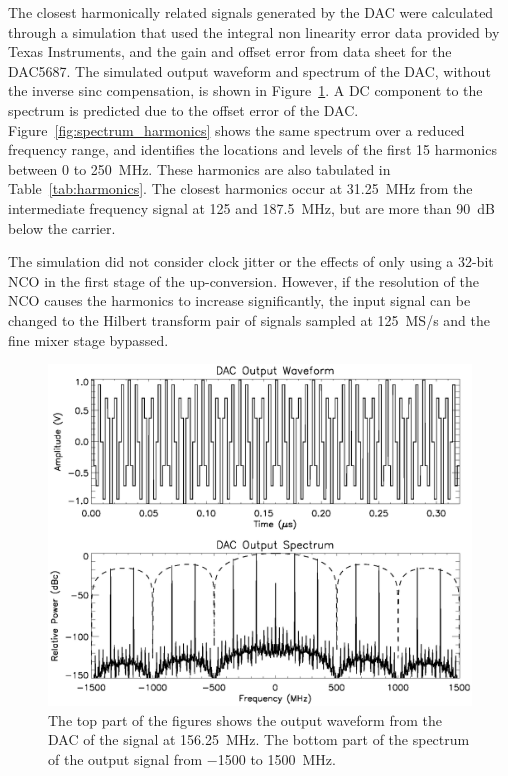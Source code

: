 \documentclass[12pt,letterpaper]{article}
\begin{document}
The closest harmonically related signals generated by the DAC were
calculated through a simulation that used the integral non linearity
error data provided by Texas Instruments, and the gain and offset
error from data sheet for the DAC5687. The simulated output waveform
and spectrum of the DAC, without the inverse sinc compensation, is
shown in Figure~\ref{fig:spectrum_images}. A DC component to the
spectrum is predicted due to the offset error of the
DAC. Figure~\ref{fig:spectrum_harmonics} shows the same spectrum over
a reduced frequency range, and identifies the locations and levels of
the first 15 harmonics between 0 to 250~MHz. These harmonics are also
tabulated in Table~\ref{tab:harmonics}. The closest harmonics occur at
31.25~MHz from the intermediate frequency signal at 125 and 187.5~MHz,
but are more than 90~dB below the carrier.

The simulation did not consider clock jitter or the effects of only
using a 32-bit NCO in the first stage of the up-conversion. However,
if the resolution of the NCO causes the harmonics to increase
significantly, the input signal can be changed to the Hilbert
transform pair of signals sampled at 125~MS/s and the fine mixer stage
bypassed.

\begin{figure}[htbp]
  \centering
  \includegraphics[scale=0.8]{spectrum-images.eps}
  \caption{The top part of the figures shows the output waveform from
    the DAC of the signal at 156.25~MHz. The bottom part of the spectrum
    of the output signal from $-$1500 to 1500~MHz.}
  \label{fig:spectrum_images}
\end{figure}
\end{document}
